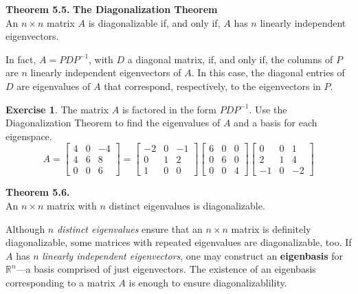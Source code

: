 \documentclass[10pt]{book}
\newcommand{\boxcolor}{gray!30}
\newenvironment{boxthm}{\begin{mdframed}[backgroundcolor=\boxcolor,nobreak=true]}{\end{mdframed}}
\newenvironment{boxdef}{\begin{mdframed}[backgroundcolor=\boxcolor,linewidth=0pt,nobreak=true]}{\end{mdframed}}
\theoremstyle{definition}
\newtheorem{exercise}{Exercise}[section]
\newcommand{\R}{\mathbb{R}}
\begin{document}
\begin{boxthm}
	\textbf{Theorem 5.5.}
	\textbf{The Diagonalization Theorem} \\
	An $n\times n$ matrix $A$ is diagonalizable if, and only if, $A$ has $n$ linearly independent eigenvectors.
	
	In fact, $A=PDP^{-1}$, with $D$ a diagonal matrix, if, and only if, the columns of $P$ are $n$ linearly independent eigenvectors of $A$. In this case, the diagonal entries of $D$ are eigenvalues of $A$ that correspond, respectively, to the eigenvectors in $P$.
\end{boxthm}

\begin{exercise} %
	The matrix $A$ is factored in the form $PDP^{-1}$. Use the Diagonalization Theorem to find the eigenvalues of $A$ and a basis for each eigenspace.
	$$ A = \begin{bmatrix}4&0&-4\\4&6&8\\0&0&6\end{bmatrix} =
	\begin{bmatrix}-2&0&-1\\0&1&2\\1&0&0\end{bmatrix}
	\begin{bmatrix}6&0&0\\0&6&0\\0&0&4\end{bmatrix}
	\begin{bmatrix}0&0&1\\2&1&4\\-1&0&-2\end{bmatrix} $$
\end{exercise}
\vfill


\newpage

\begin{boxthm}
	\textbf{Theorem 5.6.} \\
	An $n\times n$ matrix with $n$ distinct eigenvalues is diagonalizable.
\end{boxthm}
\vspace{-1em}
\begin{boxdef}
	Although $n$ \emph{distinct eigenvalues} ensure that an $n\times n$ matrix is definitely diagonalizable, some matrices with repeated eigenvalues are diagonalizable, too. If $A$ has $n$ \emph{linearly independent eigenvectors}, one may construct an \textbf{eigenbasis} for $\R^n$---a basis comprised of just eigenvectors. The existence of an eigenbasis corresponding to a matrix $A$ is enough to ensure diagonalizablility.
\end{boxdef}
\end{document}
